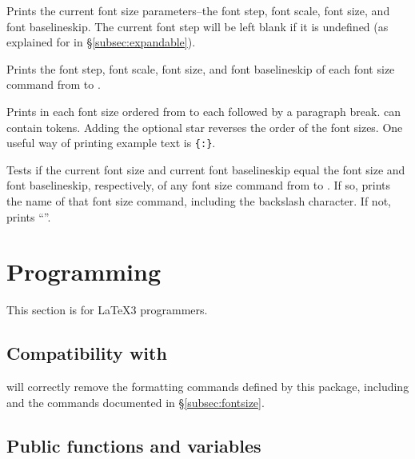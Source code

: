 \documentclass{beery}
\begin{document}
\KeepNextPar*

Prints the current font size parameters\---the font step, font scale, font size, and font baselineskip.
The current font step will be left blank if it is undefined (as explained for  in \S\ref{subsec:expandable}).

\KeepNextPar*

Prints the font step, font scale, font size, and font baselineskip of each font size command from  to .

 \sarg{} 
\KeepNextPar*

Prints  in each font size ordered from  to  each followed by a paragraph break.
 can contain  tokens.
Adding the optional star reverses the order of the font sizes.
One useful way of printing example text is \allowbreak\texttt{\{:\allowbreak\textvisiblespace\allowbreak{}\}}.

\KeepNextPar*

Tests if the current font size and current font baselineskip equal the font size and font baselineskip, respectively, of any font size command from  to .
If so, prints the name of that font size command, including the backslash character.
If not, prints \enquote{\string\undefined}.


\section{Programming}
\label{sec:programming}

This section is for \LaTeX3 programmers.

\subsection
  {%
    Compatibility with
    \texorpdfstring
      {}
      {\textbackslash{}text\_purify:n}%
  }
\label{subsec:textpurify}

 will correctly remove the formatting commands defined by this package, including  and the commands documented in \S\ref{subsec:fontsize}.

\subsection{Public functions and variables}
\label{subsec:publicexpl3}
\end{document}
